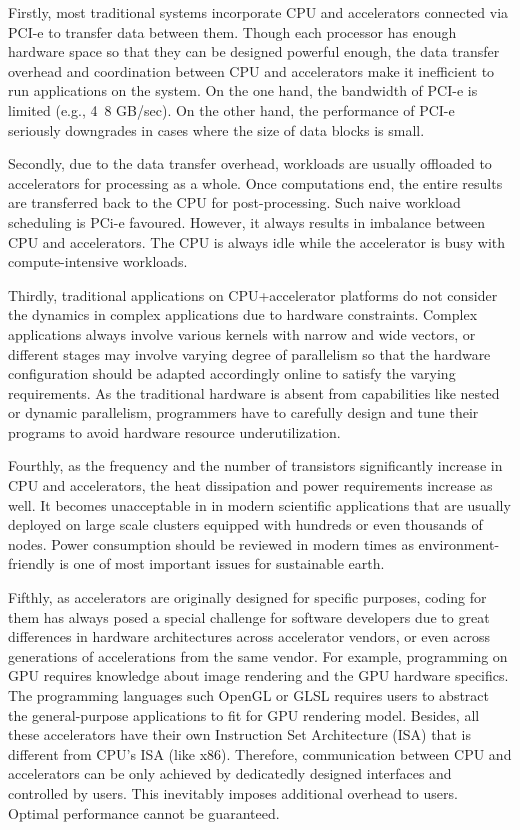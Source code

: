 Firstly, most traditional systems incorporate CPU and accelerators connected via PCI-e to transfer data between them. Though each processor has enough hardware space so that they can be designed powerful enough, the data transfer overhead and coordination between CPU and accelerators make it inefficient to run applications on the system. On the one hand, the bandwidth of PCI-e is limited (e.g., 4~8 GB/sec). On the other hand, the performance of PCI-e seriously downgrades in cases where the size of data blocks is small.

Secondly, due to the data transfer overhead, workloads are usually offloaded to accelerators for processing as a whole. Once computations end, the entire results are transferred back to the CPU for post-processing. Such naive workload scheduling is PCi-e favoured. However, it always results in imbalance between CPU and accelerators. The CPU is always idle while the accelerator is busy with compute-intensive workloads.

Thirdly, traditional applications on CPU+accelerator platforms do not consider the dynamics in complex applications due to hardware constraints. Complex applications always involve various kernels with narrow and wide vectors, or different stages may involve varying degree of parallelism so that the hardware configuration should be adapted accordingly online to satisfy the varying requirements. As the traditional hardware is absent from capabilities like nested or dynamic parallelism, programmers have to carefully design and tune their programs to avoid hardware resource underutilization.

Fourthly, as the frequency and the number of transistors significantly increase in CPU and accelerators, the heat dissipation and power requirements increase as well. It becomes unacceptable in in modern scientific applications that are usually deployed on large scale clusters equipped with hundreds or even thousands of nodes. Power consumption should be reviewed in modern times as environment-friendly is one of most important issues for sustainable earth.

Fifthly, as accelerators are originally designed for specific purposes, coding for them has always posed a special challenge for software developers due to great differences in hardware architectures across accelerator vendors, or even across generations of accelerations from the same vendor. For example, programming on GPU requires knowledge about image rendering and the GPU hardware specifics. The programming languages such OpenGL or GLSL requires users to abstract the general-purpose applications to fit for GPU rendering model. Besides, all these accelerators have their own Instruction Set Architecture (ISA) that is different from CPU's ISA (like x86). Therefore, communication between CPU and accelerators can be only achieved by dedicatedly designed interfaces and controlled by users. This inevitably imposes additional overhead to users. Optimal performance cannot be guaranteed.

